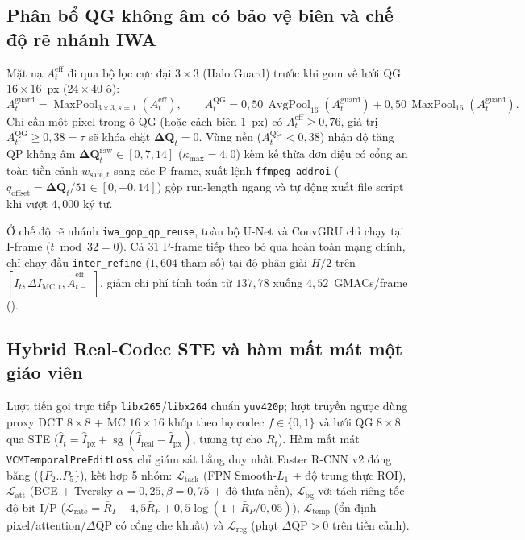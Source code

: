 \documentclass[journal]{IEEEtran}
\DeclareMathOperator{\sg}{sg}
\DeclareMathOperator{\MaxPool}{MaxPool}
\DeclareMathOperator{\AvgPool}{AvgPool}
\begin{document}
\subsection{Phân bổ QG không âm có bảo vệ biên và chế độ rẽ nhánh IWA}
Mặt nạ $A_t^{\mathrm{eff}}$ đi qua bộ lọc cực đại $3\times 3$ (Halo Guard) trước khi gom về lưới QG $16\times 16$~px ($24\times 40$ ô):
\begin{equation}
    A_t^{\mathrm{guard}} = \MaxPool_{3\times 3, s=1}(A_t^{\mathrm{eff}}), \qquad A_t^{\mathrm{QG}} = 0{,}50\,\AvgPool_{16}(A_t^{\mathrm{guard}}) + 0{,}50\,\MaxPool_{16}(A_t^{\mathrm{guard}}).
    \label{eq:qg_pool}
\end{equation}
Chỉ cần một pixel trong ô QG (hoặc cách biên $1$~px) có $A_t^{\mathrm{eff}} \ge 0{,}76$, giá trị $A_t^{\mathrm{QG}} \ge 0{,}38 = \tau$ sẽ khóa chặt $\mathbf{\Delta Q}_t = 0$. Vùng nền ($A_t^{\mathrm{QG}} < 0{,}38$) nhận độ tăng QP không âm $\mathbf{\Delta Q}_t^{\mathrm{raw}} \in [0, 7{,}14]$ ($\kappa_{\max}=4{,}0$) kèm kế thừa đơn điệu có cổng an toàn tiền cảnh $w_{\mathrm{safe},t}$ sang các P-frame, xuất lệnh \texttt{ffmpeg addroi} ($q_{\mathrm{offset}} = \mathbf{\Delta Q}_t/51 \in [0, +0{,}14]$) gộp run-length ngang và tự động xuất file script khi vượt $4{,}000$ ký tự.

Ở chế độ rẽ nhánh \texttt{iwa\_gop\_qp\_reuse}, toàn bộ U-Net và ConvGRU chỉ chạy tại I-frame ($t \bmod 32 = 0$). Cả $31$ P-frame tiếp theo bỏ qua hoàn toàn mạng chính, chỉ chạy đầu \texttt{inter\_refine} ($1{,}604$ tham số) tại độ phân giải $H/2$ trên $[I_t, \Delta I_{\mathrm{MC},t}, \tilde{A}_{t-1}^{\mathrm{eff}}]$, giảm chi phí tính toán từ $137{,}78$ xuống $4{,}52$~GMACs/frame (\tscopeIwaAnalyticalGmacSaving{}).

\subsection{Hybrid Real-Codec STE và hàm mất mát một giáo viên}
Lượt tiến gọi trực tiếp \texttt{libx265}/\texttt{libx264} chuẩn \texttt{yuv420p}; lượt truyền ngược dùng proxy DCT $8\times 8$ + MC $16\times 16$ khớp theo họ codec $f \in \{0,1\}$ và lưới QG $8\times 8$ qua STE ($\hat{I}_t = \hat{I}_{\mathrm{px}} + \sg(\hat{I}_{\mathrm{real}} - \hat{I}_{\mathrm{px}})$, tương tự cho $R_t$). Hàm mất mát \texttt{VCMTemporalPreEditLoss} chỉ giám sát bằng duy nhất Faster R-CNN v2 đóng băng ($\{P_2..P_5\}$), kết hợp 5 nhóm: $\mathcal{L}_{\mathrm{task}}$ (FPN Smooth-$L_1$ + độ trung thực ROI), $\mathcal{L}_{\mathrm{att}}$ (BCE + Tversky $\alpha=0{,}25, \beta=0{,}75$ + độ thưa nền), $\mathcal{L}_{\mathrm{bg}}$ với tách riêng tốc độ bit I/P ($\mathcal{L}_{\mathrm{rate}} = \bar{R}_I + 4{,}5\bar{R}_P + 0{,}5\log(1+\bar{R}_P/0{,}05)$), $\mathcal{L}_{\mathrm{temp}}$ (ổn định pixel/attention/$\Delta\mathrm{QP}$ có cổng che khuất) và $\mathcal{L}_{\mathrm{reg}}$ (phạt $\Delta\mathrm{QP}>0$ trên tiền cảnh).
\end{document}
